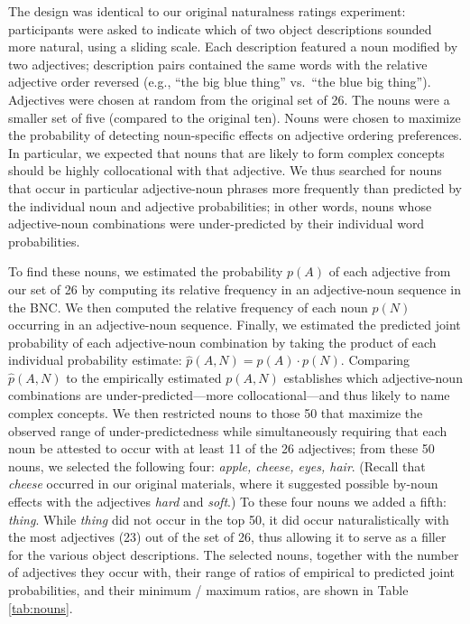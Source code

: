 \documentclass[12pt]{article}
\begin{document}
The design was identical to our original naturalness ratings experiment: participants were asked to indicate which of two object descriptions sounded more natural, using a sliding scale. Each description featured a noun modified by two adjectives; description pairs contained the same words with the relative adjective order reversed (e.g., ``the big blue thing'' vs.~``the blue big thing''). Adjectives were chosen at random from the original set of 26. The nouns were a smaller set of five (compared to the original ten). Nouns were chosen to maximize the probability of detecting noun-specific effects on adjective ordering preferences. In particular, we expected that nouns that are likely to form complex concepts should be 
highly collocational with that adjective. We thus searched for nouns that occur in particular adjective-noun phrases more frequently than predicted by the individual noun and adjective probabilities; in other words, nouns whose adjective-noun combinations were under-predicted by their individual word probabilities. %

To find these nouns, we estimated the probability $p(A)$ of each adjective from our set of 26 by computing its relative frequency in an adjective-noun sequence in the BNC. We then computed the relative frequency of each noun $p(N)$ occurring in an adjective-noun sequence. Finally, we estimated the predicted joint probability of each adjective-noun combination by taking the product of each individual probability estimate: $\hat{p}(A,N) = p(A)\cdot p(N)$. Comparing  $\hat{p}(A,N)$ to the empirically estimated $p(A,N)$ establishes which adjective-noun combinations are under-predicted---more collocational---and thus likely to name complex concepts. We then restricted nouns to those 50 that maximize the observed range of under-predictedness while simultaneously requiring that each noun be attested to occur with at least 11 of the 26 adjectives; from these 50 nouns, we selected the following four: \emph{apple, cheese, eyes, hair}. (Recall that \emph{cheese} occurred in our original materials, where it suggested possible by-noun effects with the adjectives \emph{hard} and \emph{soft}.) To these four nouns we added a fifth: \emph{thing}.
While \emph{thing} did not occur in the top 50, it did occur naturalistically with the most adjectives (23) out of the set of 26, thus allowing it to serve as a filler for the various object descriptions. The selected nouns, together with the number of adjectives they occur with, their range of ratios of empirical to predicted joint probabilities, and their minimum / maximum ratios, are shown in Table \ref{tab:nouns}.
\end{document}
